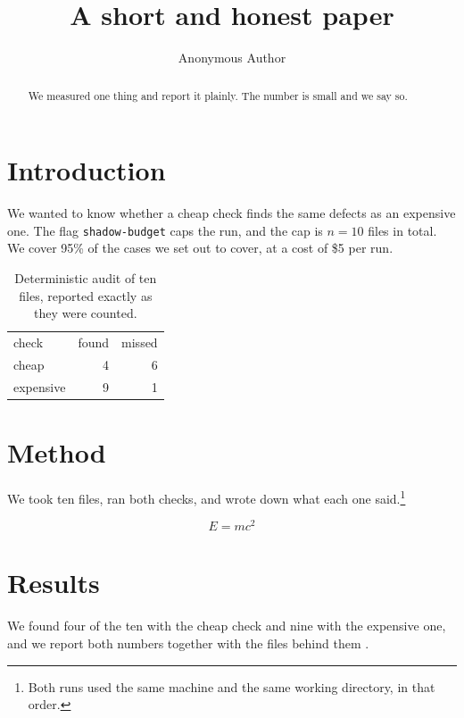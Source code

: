\documentclass[sigconf,screen]{acmart}
\begin{document}
\title{A short and honest paper}
\author{Anonymous Author}

\begin{abstract}
We measured one thing and report it plainly. The number is small and we say so.
\end{abstract}

\section{Introduction}
\label{sec:intro}
We wanted to know whether a cheap check finds the same defects as an expensive one.
The flag \texttt{shadow-budget} caps the run, and the cap is $n = 10$ files in total.
We cover 95\% of the cases we set out to cover, at a cost of \$5 per run.

\begin{table}[t]
\caption{Deterministic audit of ten files, reported exactly as they were counted.}
\label{tab:results}
\begin{tabular}{lrr}
check & found & missed \\
cheap & 4 & 6 \\
expensive & 9 & 1 \\
\end{tabular}
\end{table}

\section{Method}
We took ten files, ran both checks, and wrote down what each one said.\footnote{Both
runs used the same machine and the same working directory, in that order.}

\[
  E = m c^2
\]

\section{Results}
We found four of the ten with the cheap check and nine with the expensive one, and we
report both numbers together with the files behind them \cite{someone2020}.


\end{document}
